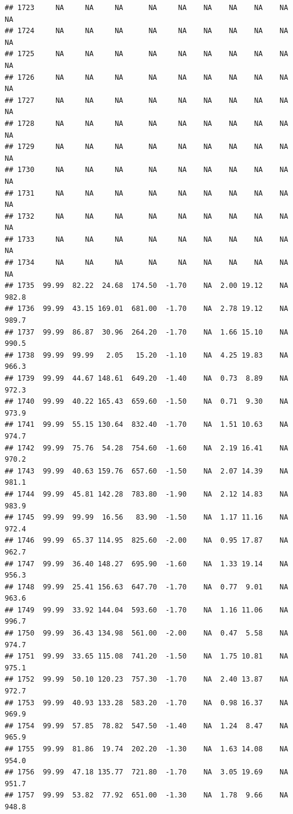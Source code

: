 \documentclass{article}\usepackage{graphicx, color}
\makeatletter
\newenvironment{kframe}{%
 \def\at@end@of@kframe{}%
 \ifinner\ifhmode%
  \def\at@end@of@kframe{\end{minipage}}%
  \begin{minipage}{\columnwidth}%
 \fi\fi%
 \def\FrameCommand##1{\hskip\@totalleftmargin \hskip-\fboxsep
 \colorbox{shadecolor}{##1}\hskip-\fboxsep
     \hskip-\linewidth \hskip-\@totalleftmargin \hskip\columnwidth}%
 \MakeFramed {\advance\hsize-\width
   \@totalleftmargin\z@ \linewidth\hsize
   \@setminipage}}%
 {\par\unskip\endMakeFramed%
 \at@end@of@kframe}
\newenvironment{knitrout}{}{} %
\makeatother
\begin{document}
\begin{knitrout}
\begin{kframe}
\begin{verbatim}
## 1723     NA     NA     NA      NA     NA    NA    NA    NA    NA     NA
## 1724     NA     NA     NA      NA     NA    NA    NA    NA    NA     NA
## 1725     NA     NA     NA      NA     NA    NA    NA    NA    NA     NA
## 1726     NA     NA     NA      NA     NA    NA    NA    NA    NA     NA
## 1727     NA     NA     NA      NA     NA    NA    NA    NA    NA     NA
## 1728     NA     NA     NA      NA     NA    NA    NA    NA    NA     NA
## 1729     NA     NA     NA      NA     NA    NA    NA    NA    NA     NA
## 1730     NA     NA     NA      NA     NA    NA    NA    NA    NA     NA
## 1731     NA     NA     NA      NA     NA    NA    NA    NA    NA     NA
## 1732     NA     NA     NA      NA     NA    NA    NA    NA    NA     NA
## 1733     NA     NA     NA      NA     NA    NA    NA    NA    NA     NA
## 1734     NA     NA     NA      NA     NA    NA    NA    NA    NA     NA
## 1735  99.99  82.22  24.68  174.50  -1.70    NA  2.00 19.12    NA  982.8
## 1736  99.99  43.15 169.01  681.00  -1.70    NA  2.78 19.12    NA  989.7
## 1737  99.99  86.87  30.96  264.20  -1.70    NA  1.66 15.10    NA  990.5
## 1738  99.99  99.99   2.05   15.20  -1.10    NA  4.25 19.83    NA  966.3
## 1739  99.99  44.67 148.61  649.20  -1.40    NA  0.73  8.89    NA  972.3
## 1740  99.99  40.22 165.43  659.60  -1.50    NA  0.71  9.30    NA  973.9
## 1741  99.99  55.15 130.64  832.40  -1.70    NA  1.51 10.63    NA  974.7
## 1742  99.99  75.76  54.28  754.60  -1.60    NA  2.19 16.41    NA  970.2
## 1743  99.99  40.63 159.76  657.60  -1.50    NA  2.07 14.39    NA  981.1
## 1744  99.99  45.81 142.28  783.80  -1.90    NA  2.12 14.83    NA  983.9
## 1745  99.99  99.99  16.56   83.90  -1.50    NA  1.17 11.16    NA  972.4
## 1746  99.99  65.37 114.95  825.60  -2.00    NA  0.95 17.87    NA  962.7
## 1747  99.99  36.40 148.27  695.90  -1.60    NA  1.33 19.14    NA  956.3
## 1748  99.99  25.41 156.63  647.70  -1.70    NA  0.77  9.01    NA  963.6
## 1749  99.99  33.92 144.04  593.60  -1.70    NA  1.16 11.06    NA  996.7
## 1750  99.99  36.43 134.98  561.00  -2.00    NA  0.47  5.58    NA  974.7
## 1751  99.99  33.65 115.08  741.20  -1.50    NA  1.75 10.81    NA  975.1
## 1752  99.99  50.10 120.23  757.30  -1.70    NA  2.40 13.87    NA  972.7
## 1753  99.99  40.93 133.28  583.20  -1.70    NA  0.98 16.37    NA  969.9
## 1754  99.99  57.85  78.82  547.50  -1.40    NA  1.24  8.47    NA  965.9
## 1755  99.99  81.86  19.74  202.20  -1.30    NA  1.63 14.08    NA  954.0
## 1756  99.99  47.18 135.77  721.80  -1.70    NA  3.05 19.69    NA  951.7
## 1757  99.99  53.82  77.92  651.00  -1.30    NA  1.78  9.66    NA  948.8

\end{verbatim}
\end{kframe}
\end{knitrout}
\end{document}
